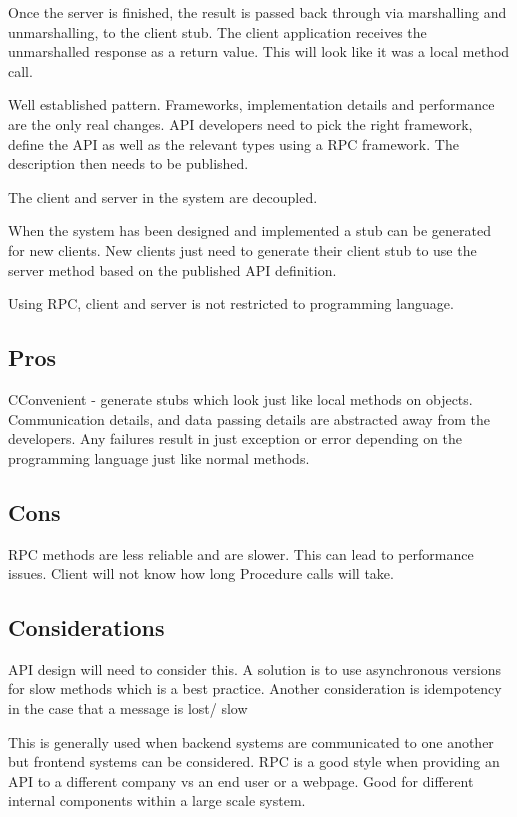 \documentclass[a4paper, 11pt]{book}
\begin{document}
    Once the server is finished, the result is passed back through via marshalling and unmarshalling, to the client stub.
    The client application receives the unmarshalled response as a return value.
    This will look like it was a local method call.

    Well established pattern.
    Frameworks, implementation details and performance are the only real changes.
    API developers need to pick the right framework, define the API as well as the relevant types using a RPC framework.
    The description then needs to be published.

    The client and server in the system are decoupled.

    When the system has been designed and implemented a stub can be generated for new clients.
    New clients just need to generate their client stub to use the server method based on the published API definition.

    Using RPC, client and server is not restricted to programming language.

    \subsection{Pros}
    CConvenient - generate stubs which look just like local methods on objects.
    Communication details, and data passing details are abstracted away from the developers.
    Any failures result in just exception or error depending on the programming language just like normal methods.

    \subsection{Cons}
    RPC methods are less reliable and are slower.
    This can lead to performance issues.
    Client will not know how long Procedure calls will take.

    \subsection{Considerations}
    API design will need to consider this.
    A solution is to use asynchronous versions for slow methods which is a best practice.
    Another consideration is idempotency in the case that a message is lost/ slow

    This is generally used when backend systems are communicated to one another but frontend systems can be considered.
    RPC is a good style when providing an API to a different company vs an end user or a webpage.
    Good for different internal components within a large scale system.
\end{document}
